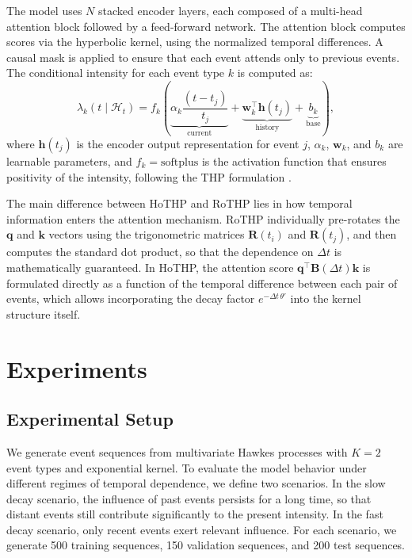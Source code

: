 \documentclass[runningheads]{llncs}
\begin{document}
The model uses $N$ stacked encoder layers, each composed of a multi-head attention block followed by a feed-forward network. The attention block computes scores via the hyperbolic kernel, using the normalized temporal differences. A causal mask is applied to ensure that each event attends only to previous events. The conditional intensity for each event type $k$ is computed as:
%
\begin{equation}
\lambda_k(t \mid \mathcal{H}_t) = f_k\!\left(\underbrace{\alpha_k \frac{(t - t_j)}{t_j}}_{\text{current}} + \underbrace{\bm{w}_k^\top \bm{h}(t_j)}_{\text{history}} + \underbrace{b_k}_{\text{base}}\right),
\label{eq:intensidade}
\end{equation}
%
where $\bm{h}(t_j)$ is the encoder output representation for event $j$, $\alpha_k$, $\bm{w}_k$, and $b_k$ are learnable parameters, and $f_k = \mathrm{softplus}$ is the activation function that ensures positivity of the intensity, following the THP formulation \cite{zuo2020transformer}.

The main difference between HoTHP and RoTHP lies in how temporal information enters the attention mechanism. RoTHP individually pre-rotates the $\bm{q}$ and $\bm{k}$ vectors using the trigonometric matrices $\bm{R}(t_i)$ and $\bm{R}(t_j)$, and then computes the standard dot product, so that the dependence on $\Delta t$ is mathematically guaranteed. In HoTHP, the attention score $\bm{q}^\top \bm{B}(\Delta t) \bm{k}$ is formulated directly as a function of the temporal difference between each pair of events, which allows incorporating the decay factor $e^{-\Delta t \, \theta'}$ into the kernel structure itself.

\section{Experiments}

\subsection{Experimental Setup}

We generate event sequences from multivariate Hawkes processes with $K=2$ event types and exponential kernel. To evaluate the model behavior under different regimes of temporal dependence, we define two scenarios. In the slow decay scenario, the influence of past events persists for a long time, so that distant events still contribute significantly to the present intensity. In the fast decay scenario, only recent events exert relevant influence. For each scenario, we generate 500 training sequences, 150 validation sequences, and 200 test sequences.
\end{document}
